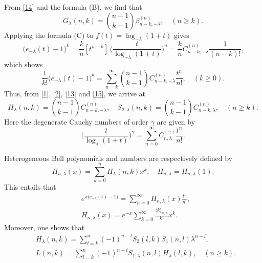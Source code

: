 \documentclass[a4paper,11pt]{amsart}
\begin{document}
From \eqref{14} and the formula (B), we find that
\begin{equation*}
G_{\lambda}(n,k)=\binom{n-1}{k-1}\beta_{n-k, -\lambda}^{(n)}, \quad (n \ge k).
\end{equation*}
Applying the formula (C) to $f(t)=\log_{-\lambda}(1+t)$ gives
\begin{equation*}
[t^{n}]\,\big(e_{-\lambda}(t)-1\big)^{k}=\frac{k}{n}[t^{n-k}]\,\Big(\frac{t}{\log_{-\lambda}(1+t)}\Big)^{n}=\frac{k}{n}C_{n-k,-\lambda}^{(n)} \frac{1}{(n-k)!},
\end{equation*}
which shows
\begin{equation} \label{15}
\frac{1}{k!}\big(e_{-\lambda}(t)-1\big)^{k}=\sum_{n=k}^{\infty}\binom{n-1}{k-1}C_{n-k, -\lambda}^{(n)}\frac{t^{n}}{n!},\quad (k \ge 0).
\end{equation}
Thus, from \eqref{1}, \eqref{2}, \eqref{13} and \eqref{15}, we arrive at
\begin{equation*}
H_{\lambda}(n,k)=\binom{n-1}{k-1}C_{n-k, -\lambda}^{(n)}, \quad S_{2,\lambda}(n,k)=\binom{n-1}{k-1}C_{n-k, \lambda}^{(n)}, \quad (n \ge k).
\end{equation*}
Here the degenerate Cauchy numbers of order $\gamma$ are given by
\begin{equation} \label{16}
\Big(\frac{t}{\log_{\lambda}(1+t)}\Big)^{\gamma}=\sum_{n=0}^{\infty}C_{n,\lambda}^{(\gamma)}\frac{t^{n}}{n!}.
\end{equation} \par
Heterogeneous Bell polynomials and numbers are respectively defined by
\begin{equation} \label{17}
H_{n,\lambda}(x)=\sum_{k=0}^{n}H_{\lambda}(n,k)x^{k}, \quad H_{n,\lambda}=H_{n,\lambda}(1).
\end{equation}
This entails that
\begin{equation} \label{18}
\begin{aligned}
&e^{x\big(e_{-\lambda}(t)-1\big)}=\sum_{n=0}^{\infty}H_{n,\lambda}(x)\frac{t^{n}}{n!}, \\
&H_{n,\lambda}(x)=e^{-x}\sum_{k=0}^{\infty}\frac{\langle k \rangle_{n,\lambda}}{k!}x^{k}.
\end{aligned}
\end{equation}
Moreover, one shows that
\begin{align*}
&H_{\lambda}(n,k)=\sum_{l=k}^{n}(-1)^{n-l}S_{2}(l,k)S_{1}(n,l)\lambda^{n-l}, \\
&L(n,k)=\sum_{l=k}^{n}(-1)^{n-l}S_{1,\lambda}(n,l)H_{\lambda}(l,k),\quad (n \ge k).
\end{align*} \par
\end{document}
